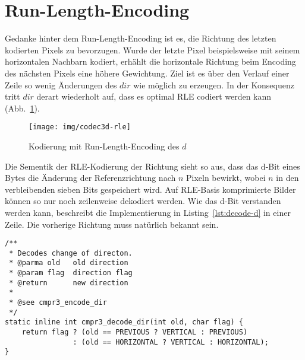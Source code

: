 \section{Run-Length-Encoding}
\label{sec:codec-rle}
Gedanke hinter dem Run-Length-Encoding ist es, die Richtung des letzten kodierten
Pixels zu bevorzugen. Wurde der letzte Pixel beispielsweise mit seinem
horizontalen Nachbarn kodiert, erh\"ahlt die horizontale Richtung beim Encoding
des n\"achsten Pixels eine h\"ohere Gewichtung. Ziel ist es \"uber den Verlauf
einer Zeile so wenig \"Anderungen des $dir$ wie m\"oglich zu erzeugen. In der
Konsequenz tritt $dir$ derart wiederholt auf, dass es optimal RLE codiert
werden kann (Abb.~\ref{fig:codec3d-rle}).
\\
\begin{figure}[tbhp]
\begin{center}
\texttt{[image: img/codec3d-rle]}
\end{center}
\caption{Kodierung mit Run-Length-Encoding des $d$}
\label{fig:codec3d-rle}
\end{figure}
%
Die Sementik der RLE-Kodierung der Richtung sieht so aus, dass das d-Bit eines
Bytes die \"Anderung der Referenzrichtung nach $n$ Pixeln bewirkt, wobei $n$ in
den verbleibenden sieben Bits gespeichert wird. Auf RLE-Basis komprimierte
Bilder k\"onnen so nur noch zeilenweise dekodiert werden. Wie das d-Bit
verstanden werden kann, beschreibt die Implementierung in 
Listing~\ref{lst:decode-d} in einer Zeile. Die vorherige Richtung muss nat\"urlich
bekannt sein.


\begin{lstlisting}[caption=Dekodierung d-Bits eines RLE-Bytes,%
                   label=lst:decode-d]
/**
 * Decodes change of directon.
 * @parma old   old direction
 * @param flag  direction flag
 * @return      new direction
 *
 * @see cmpr3_encode_dir
 */
static inline int cmpr3_decode_dir(int old, char flag) {
    return flag ? (old == PREVIOUS ? VERTICAL : PREVIOUS) 
                : (old == HORIZONTAL ? VERTICAL : HORIZONTAL);
}
\end{lstlisting}

